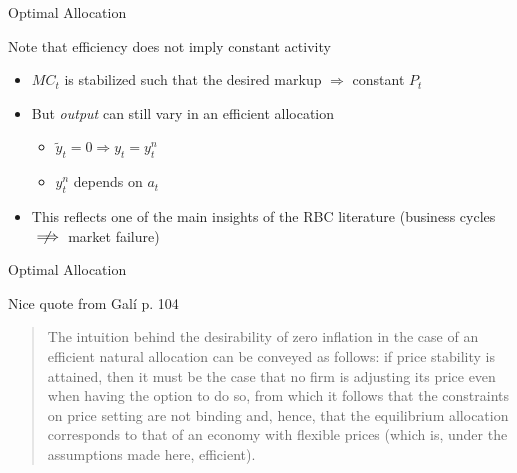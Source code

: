 \begin{frame}{Optimal Allocation}

Note that efficiency does not imply constant activity
\begin{itemize}
\item	$MC_{t}$ is stabilized such that the desired markup $\Rightarrow$ constant $P_{t}$
\item	But \emph{output} can still vary in an efficient allocation
	\begin{itemize}
	\item	$\tilde{y}_{t}=0 \Rightarrow y_{t} = y^{n}_{t}$
	\item	$y^{n}_{t}$ depends on $a_{t}$
	\end{itemize}
\item	This reflects one of the main insights of the RBC literature (business cycles $\centernot\implies$ market failure)
\end{itemize}


\end{frame}


	
\begin{frame}{Optimal Allocation}

Nice quote from Gal\'i p. 104

\begin{quotation}
The intuition behind the desirability of zero inflation in the case of an efficient natural allocation can be conveyed as follows: if price stability is attained, then it must be the case that no firm is adjusting its price even when having the option to do so, from which it follows that the constraints on price setting are not binding and, hence, that the equilibrium allocation corresponds to that of an economy with flexible prices (which is, under the assumptions made here, efficient).
\end{quotation}

\end{frame}


	

